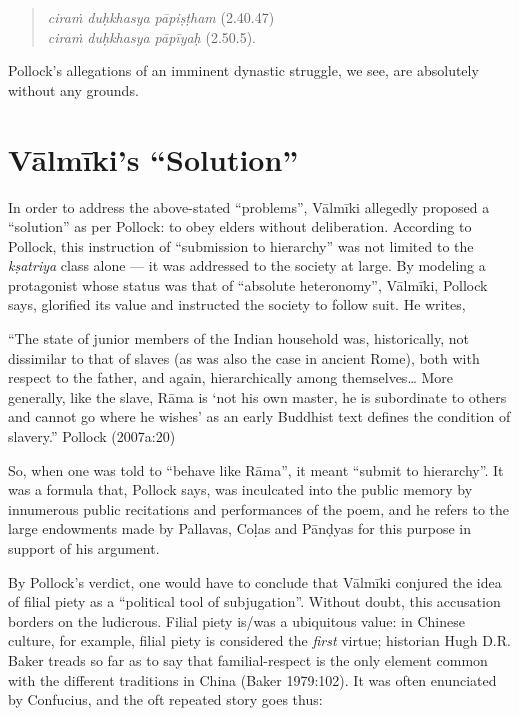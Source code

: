 \newpage

\begin{quote}
{\sl ciraṁ duḥkhasya pāpiṣṭham} (2.40.47)\\ 
{\sl ciraṁ duḥkhasya pāpīyaḥ} (2.50.5). 
\end{quote}

Pollock’s allegations of an imminent dynastic struggle, we see, are absolutely without any grounds. 

\section{Vālmīki’s “Solution”}\label{sec1.3}

In order to address the above-stated “problems”, Vālmīki allegedly proposed a “solution” as per Pollock: to obey elders without deliberation. According to Pollock, this instruction of “submission to hierarchy” was not limited to the {\sl kṣatriya} class alone --- it was addressed to the society at large. By modeling a protagonist whose status was that of “absolute heteronomy”, Vālmīki, Pollock says, glorified its value and instructed the society to follow suit. He writes,

\begin{myquote}
“The state of junior members of the Indian household was, historically, not dissimilar to that of slaves (as was also the case in ancient Rome), both with respect to the father, and again, hierarchically among themselves… More generally, like the slave, Rāma is ‘not his own master, he is subordinate to others and cannot go where he wishes’ as an early Buddhist text defines the condition of slavery.” 				                                        
\hfill Pollock (2007a:20)
\end{myquote}

So, when one was told to “behave like Rāma”, it meant “submit to hierarchy”. It was a formula that, Pollock says, was inculcated into the public memory by innumerous public recitations and performances of the poem, and he refers to the large endowments made by Pallavas, Coḷas and Pānḍyas for this purpose in support of his argument.

By Pollock’s verdict, one would have to conclude that Vālmīki conjured the idea of filial piety as a “political tool of subjugation”. Without doubt, this accusation borders on the ludicrous. Filial piety is/was a ubiquitous value: in Chinese culture, for example, filial piety is considered the {\sl first} virtue; historian Hugh D.R. Baker treads so far as to say that familial-respect is the only element common with the different traditions in China (Baker 1979:102). It was often enunciated by Confucius, and the oft repeated story goes thus: 

